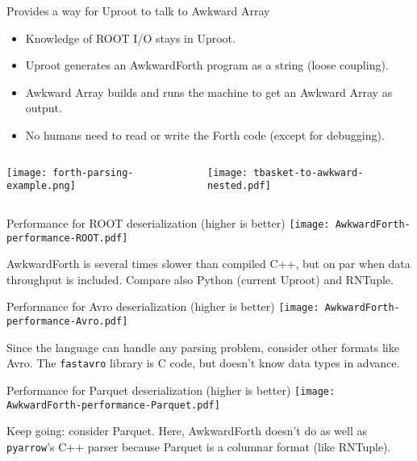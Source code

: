 \documentclass[aspectratio=169]{beamer}
\begin{document}
\begin{frame}{Provides a way for Uproot to talk to Awkward Array}
\vspace{0.25 cm}
\begin{itemize}
\item Knowledge of ROOT I/O stays in Uproot.
\item Uproot generates an AwkwardForth program as a string (loose coupling).
\item Awkward Array builds and runs the machine to get an Awkward Array as output.
\item No humans need to read or write the Forth code (except for debugging).
\end{itemize}

\begin{columns}

\texttt{[image: forth-parsing-example.png]}

\texttt{[image: tbasket-to-awkward-nested.pdf]}

\end{columns}
\end{frame}

\begin{frame}{Performance for ROOT deserialization (higher is better)}
\large
\vspace{0.2 cm}
\texttt{[image: AwkwardForth-performance-ROOT.pdf]}

AwkwardForth is several times slower than compiled C++, but on par when data throughput is included. Compare also Python (current Uproot) and RNTuple.
\end{frame}

\begin{frame}{Performance for Avro deserialization (higher is better)}
\large
\vspace{0.2 cm}
\texttt{[image: AwkwardForth-performance-Avro.pdf]}

Since the language can handle any parsing problem, consider other formats like Avro. The \texttt{fastavro} library is C code, but doesn't know data types in advance.
\end{frame}

\begin{frame}{Performance for Parquet deserialization (higher is better)}
\large
\vspace{0.2 cm}
\texttt{[image: AwkwardForth-performance-Parquet.pdf]}

Keep going: consider Parquet. Here, AwkwardForth doesn't do as well as \texttt{pyarrow}'s C++ parser because Parquet is a columnar format (like RNTuple).
\end{frame}
\end{document}
